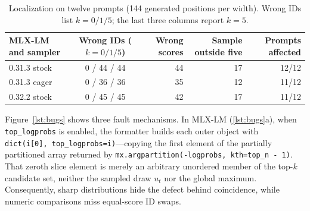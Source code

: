 \documentclass[11pt,letterpaper]{article}
\begin{document}
\begin{table}[t]
\centering
\caption{Localization on twelve prompts (144 generated positions per width). Wrong IDs list $k=0 / 1 / 5$; the last three columns report $k=5$.}
\label{tab:release}
\footnotesize
\begin{tabular}{@{}lcrrr@{}}\toprule
MLX-LM and sampler & Wrong IDs ($k=0/1/5$) & Wrong scores & Sample outside five & Prompts affected\\\midrule
0.31.3 stock & 0 / 44 / 44 & 44 & 17 & 12/12\\
0.31.3 eager & 0 / 36 / 36 & 35 & 12 & 11/12\\
0.32.2 stock & 0 / 45 / 45 & 42 & 17 & 11/12\\\bottomrule
\end{tabular}
\end{table}

Figure~\ref{lst:bugs} shows three fault mechanisms. In MLX-LM (\ref{lst:bugs}a), when \texttt{top\_logprobs} is enabled, the formatter builds each outer object with \texttt{dict(i[0],\allowbreak\ top\_logprobs=i)}---copying the first element of the partially partitioned array returned by \texttt{mx.\allowbreak argpartition(\allowbreak -logprobs, kth=top\_n - 1)}. That zeroth slice element is merely an arbitrary unordered member of the top-$k$ candidate set, neither the sampled draw $u_t$ nor the global maximum. Consequently, sharp distributions hide the defect behind coincidence, while numeric comparisons miss equal-score ID swaps.
\end{document}
